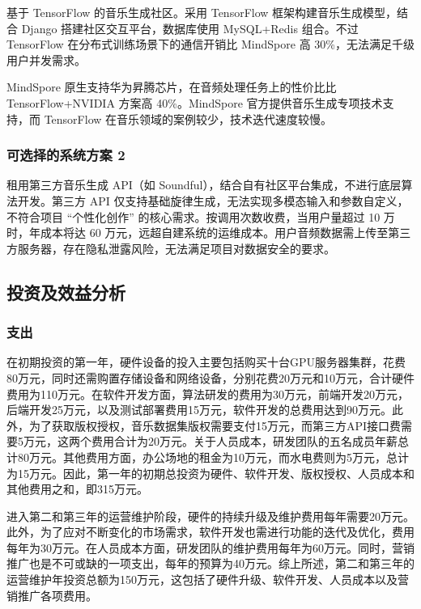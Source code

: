 \documentclass{base}
\numberwithin{figure}{section} %
\begin{document}
基于 TensorFlow 的音乐生成社区。采用 TensorFlow 框架构建音乐生成模型，结合 Django 搭建社区交互平台，数据库使用 MySQL+Redis 组合。不过 TensorFlow 在分布式训练场景下的通信开销比 MindSpore 高 30\%，无法满足千级用户并发需求。

MindSpore 原生支持华为昇腾芯片，在音频处理任务上的性价比比 TensorFlow+NVIDIA 方案高 40\%。MindSpore 官方提供音乐生成专项技术支持，而 TensorFlow 在音乐领域的案例较少，技术迭代速度较慢。

\subsubsection{可选择的系统方案 2}

租用第三方音乐生成 API（如 Soundful），结合自有社区平台集成，不进行底层算法开发。第三方 API 仅支持基础旋律生成，无法实现多模态输入和参数自定义，不符合项目 “个性化创作” 的核心需求。按调用次数收费，当用户量超过 10 万时，年成本将达 60 万元，远超自建系统的运维成本。用户音频数据需上传至第三方服务器，存在隐私泄露风险，无法满足项目对数据安全的要求。

\subsection{投资及效益分析}

\subsubsection{支出}

在初期投资的第一年，硬件设备的投入主要包括购买十台GPU服务器集群，花费80万元，同时还需购置存储设备和网络设备，分别花费20万元和10万元，合计硬件费用为110万元。在软件开发方面，算法研发的费用为30万元，前端开发20万元，后端开发25万元，以及测试部署费用15万元，软件开发的总费用达到90万元。此外，为了获取版权授权，音乐数据集版权需要支付15万元，而第三方API接口费需要5万元，这两个费用合计为20万元。关于人员成本，研发团队的五名成员年薪总计80万元。其他费用方面，办公场地的租金为10万元，而水电费则为5万元，总计为15万元。因此，第一年的初期总投资为硬件、软件开发、版权授权、人员成本和其他费用之和，即315万元。

进入第二和第三年的运营维护阶段，硬件的持续升级及维护费用每年需要20万元。此外，为了应对不断变化的市场需求，软件开发也需进行功能的迭代及优化，费用每年为30万元。在人员成本方面，研发团队的维护费用每年为60万元。同时，营销推广也是不可或缺的一项支出，每年的预算为40万元。综上所述，第二和第三年的运营维护年投资总额为150万元，这包括了硬件升级、软件开发、人员成本以及营销推广各项费用。
\end{document}
